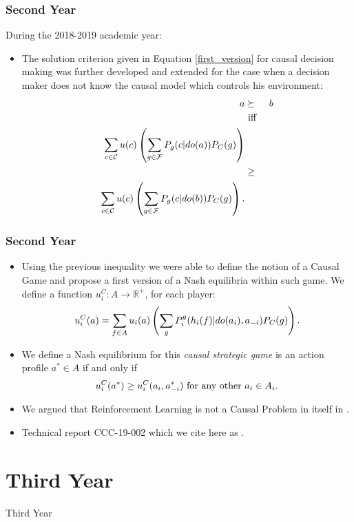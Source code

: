 \documentclass{beamer}
\theoremstyle{plain}
\begin{document}
\begin{frame}
\frametitle{Second Year}
During the 2018-2019 academic year:
\begin{itemize}
\item The solution criterion given in Equation \ref{first_version} for causal decision making was further developed and extended for the case when a decision maker does not know the causal model which controls his environment:
\begin{eqnarray*}{\label{second_version}}
a &\succeq & b\\ 
   &\textrm{ iff }&\\ 
\sum_{c \in \mathcal{C}} u(c) \left( \sum_{g \in \mathcal{F}} P_g(c | do(a))P_C(g) \right) \\
&\geq & \\ \sum_{c \in \mathcal{C}}  u(c) \left( \sum_{g \in \mathcal{F}} P_g(c | do(b))P_C(g) \right).
\end{eqnarray*}
\end{itemize}
\end{frame}

\begin{frame}
\frametitle{Second Year}
\begin{itemize}
\item Using the previous inequality we were able to define the notion of a Causal Game and propose a first version of a Nash equilibria within such game. We define a function $u^C_i : A \to \mathbb{R}^{+}$, for each player:
\begin{equation}{\label{games_causal_ut}}
u^C_i (a) = \sum_{f \in A}  u_i(a) \left( \sum_g P^g_i (h_i(f) | do(a_i), a_{-i}) P_C(g) \right).
\end{equation}
\item We define a Nash equilibrium for this \textit{causal strategic game} is an action profile $a^\ast \in A$ if and only if
\begin{equation}{\label{nash_eq}}
 u^C_i(a^\ast) \geq u^C_i(a_i, a^\ast_{-i}) \textrm{ for any other } a_i \in A_i. 
 \end{equation}
 \item We argued that Reinforcement Learning is not a Causal Problem in itself in \cite{gonzalez2019reinforcement}.
 \item Technical report CCC-19-002 which we cite here as \cite{gonzalez2019causal}. 
\end{itemize}
\end{frame}

\section{Third Year}
\begin{frame}
\begin{center}
\LARGE{Third Year}
\end{center}
\end{frame}
\end{document}
